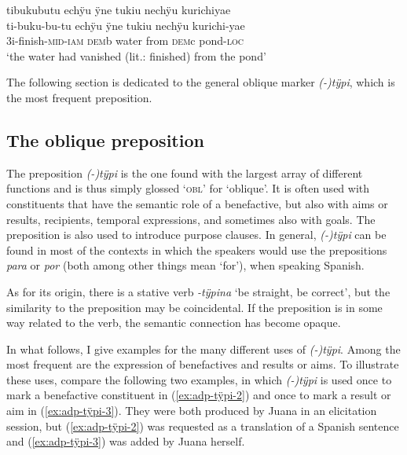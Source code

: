 \ea\label{ex:adp-tukiu-6}
\begingl
\glpreamble tibukubutu echÿu ÿne tukiu nechÿu kurichiyae\\
\gla ti-buku-bu-tu echÿu ÿne tukiu nechÿu kurichi-yae\\
\glb 3i-finish-\textsc{mid}-\textsc{iam} \textsc{dem}b water from \textsc{dem}c pond-\textsc{loc}\\
\glft ‘the water had vanished (lit.: finished) from the pond’
\endgl
\trailingcitation{[jmx-n120429ls-x5.283]}
\xe


The following section is dedicated to the general oblique marker \textit{(-)tÿpi}, which is the most frequent preposition.

\subsection{The oblique preposition}\label{sec:adp-tÿpi}

The preposition \textit{(-)tÿpi} is the one found with the largest array of different functions and is thus simply glossed ‘\textsc{obl}’ for ‘oblique’. It is often used with constituents that have the semantic role of a benefactive, but also with aims or results, recipients, temporal expressions, and sometimes also with goals. The preposition is also used to introduce purpose clauses. In general, \textit{(-)tÿpi} can be found in most of the contexts in which the speakers would use the prepositions \textit{para} or \textit{por} (both among other things mean ‘for’), when speaking Spanish.

As for its origin, there is a stative verb \textit{-tÿpina} ‘be straight, be correct’, but the similarity to the preposition may be coincidental. If the preposition is in some way related to the verb, the semantic connection has become opaque. 

In what follows, I give examples for the many different uses of \textit{(-)tÿpi}. Among the most frequent are the expression of benefactives and results or aims. To illustrate these uses, compare the following two examples, in which \textit{(-)tÿpi} is used once to mark a benefactive constituent in (\ref{ex:adp-tÿpi-2}) and once to mark a result or aim in (\ref{ex:adp-tÿpi-3}). They were both produced by Juana in an elicitation session, but (\ref{ex:adp-tÿpi-2}) was requested as a translation of a Spanish sentence and (\ref{ex:adp-tÿpi-3}) was added by Juana herself.

